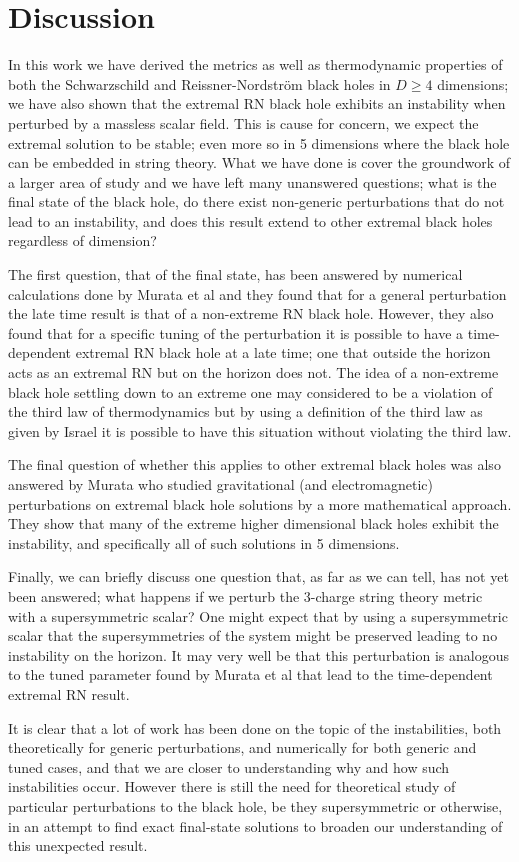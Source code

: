 \documentclass[12pt]{article}
\numberwithin{equation}{section}
\numberwithin{figure}{section}
\begin{document}
\section{Discussion} %
\label{sec:conclusion}
In this work we have derived the metrics as well as thermodynamic properties of both the Schwarzschild and Reissner-Nordstr\"om black holes in $D\ge4$ dimensions; we have also shown that the extremal RN black hole exhibits an instability when perturbed by a massless scalar field. This is cause for concern, we expect the extremal solution to be stable; even more so in 5 dimensions where the black hole can be embedded in string theory. What we have done is cover the groundwork of a larger area of study and we have left many unanswered questions; what is the final state of the black hole, do there exist non-generic perturbations that do not lead to an instability, and does this result extend to other extremal black holes regardless of dimension? 

The first question, that of the final state, has been answered by numerical calculations done by Murata et al\cite{Murata:2013daa} and they found that for a general perturbation the late time result is that of a non-extreme RN black hole. However, they also found that for a specific tuning of the perturbation it is possible to have a time-dependent extremal RN black hole at a late time; one that outside the horizon acts as an extremal RN but on the horizon does not. The idea of a non-extreme black hole settling down to an extreme one may considered to be a violation of the third law of thermodynamics but by using a definition of the third law as given by Israel\cite{PhysRevLett.57.397} it is possible to have this situation without violating the third law.

The final question of whether this applies to other extremal black holes was also answered by Murata\cite{Murata:2012ct} who studied gravitational (and electromagnetic) perturbations on extremal black hole solutions by a more mathematical approach. They show that many of the extreme higher dimensional black holes exhibit the instability, and specifically all of such solutions in 5 dimensions.

Finally, we can briefly discuss one question that, as far as we can tell, has not yet been answered; what happens if we perturb the 3-charge string theory metric with a supersymmetric scalar? One might expect that by using a supersymmetric scalar that the supersymmetries of the system might be preserved leading to no instability on the horizon. It may very well be that this perturbation is analogous to the tuned parameter found by Murata et al that lead to the time-dependent extremal RN result. 

It is clear that a lot of work has been done on the topic of the instabilities, both theoretically for generic perturbations, and numerically for both generic and tuned cases, and that we are closer to understanding why and how such instabilities occur. However there is still the need for theoretical study of particular perturbations to the black hole, be they supersymmetric or otherwise, in an attempt to find exact final-state solutions to broaden our understanding of this unexpected result.
\nocite{*}

 
\end{document}

